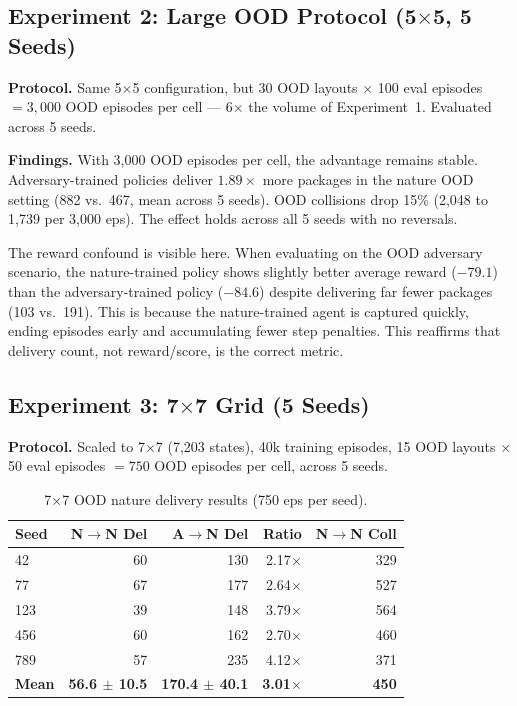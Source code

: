 \documentclass[sigconf]{aamas}
\begin{document}
\subsection{Experiment 2: Large OOD Protocol (5$\times$5, 5 Seeds)}

\textbf{Protocol.} Same 5$\times$5 configuration, but 30 OOD layouts $\times$
100 eval episodes $= 3{,}000$ OOD episodes per cell — 6$\times$ the volume of
Experiment~1. Evaluated across 5 seeds.

\textbf{Findings.} With 3,000 OOD episodes per cell, the advantage remains stable.
Adversary-trained policies deliver $1.89\times$ more packages in the nature
OOD setting (882 vs.\ 467, mean across 5 seeds). OOD collisions drop 15\% (2,048
to 1,739 per 3,000 eps). The effect holds across all 5 seeds with no reversals.

The reward confound is visible here. When evaluating on the OOD adversary scenario, the
nature-trained policy shows slightly better average reward ($-79.1$) than the
adversary-trained policy ($-84.6$) despite delivering far fewer packages (103 vs.\
191). This is because the nature-trained agent is captured quickly, ending episodes
early and accumulating fewer step penalties. This reaffirms that delivery count, not reward/score, is the correct metric.

\subsection{Experiment 3: 7$\times$7 Grid (5 Seeds)}
\label{sec:7x7}

\textbf{Protocol.} Scaled to 7$\times$7 (7,203 states), 40k training episodes,
15 OOD layouts $\times$ 50 eval episodes $= 750$ OOD episodes per cell, across 5 seeds.

\begin{table}[H]
\caption{7$\times$7 OOD nature delivery results (750 eps per seed).}
\label{tab:7x7}
\centering
\footnotesize
\begin{tabular}{lrrrr}
\toprule
\textbf{Seed} & \textbf{N$\to$N Del} & \textbf{A$\to$N Del} & \textbf{Ratio} & \textbf{N$\to$N Coll} \\
\midrule
42  & 60  & 130 & 2.17$\times$ & 329 \\
77  & 67  & 177 & 2.64$\times$ & 527 \\
123 & 39  & 148 & 3.79$\times$ & 564 \\
456 & 60  & 162 & 2.70$\times$ & 460 \\
789 & 57  & 235 & 4.12$\times$ & 371 \\
\midrule
\textbf{Mean} & \textbf{56.6 $\pm$ 10.5} & \textbf{170.4 $\pm$ 40.1} & \textbf{3.01$\times$} & \textbf{450} \\
\bottomrule
\end{tabular}
\end{table}
\end{document}
